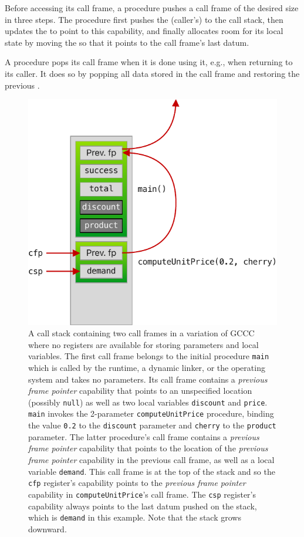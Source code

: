 \documentclass[main.tex]{subfiles}
\begin{document}
Before accessing its call frame, a procedure pushes a call frame of the desired size in three steps. The procedure first pushes the (caller's)  to the call stack, then updates the  to point to this capability, and finally allocates room for its local state by moving the  so that it points to the call frame's last datum.

A procedure pops its call frame when it is done using it, e.g., when returning to its caller. It does so by popping all data stored in the call frame and restoring the previous .


\begin{figure}
	\begin{center}
		\includegraphics{Images/GCCC Stack.pdf}
	\end{center}
	\caption{A call stack containing two call frames in a variation of GCCC where no registers are available for storing parameters and local variables. The first call frame belongs to the initial procedure \texttt{main} which is called by the runtime, a dynamic linker, or the operating system and takes no parameters. Its call frame contains a \emph{previous frame pointer} capability that points to an unspecified location (possibly \texttt{null}) as well as two local variables \texttt{discount} and \texttt{price}. \texttt{main} invokes the 2-parameter \texttt{computeUnitPrice} procedure, binding the value \texttt{0.2} to the \texttt{discount} parameter and \texttt{cherry} to the \texttt{product} parameter. The latter procedure's call frame contains a \emph{previous frame pointer} capability that points to the location of the \emph{previous frame pointer} capability in the previous call frame, as well as a local variable \texttt{demand}. This call frame is at the top of the stack and so the \texttt{cfp} register's capability points to the \emph{previous frame pointer} capability in \texttt{computeUnitPrice}'s call frame. The \texttt{csp} register's capability always points to the last datum pushed on the stack, which is \texttt{demand} in this example. Note that the stack grows downward.}

\end{figure}
\end{document}
